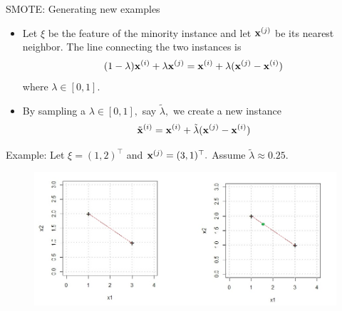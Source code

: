 \documentclass[11pt,compress,t,notes=noshow, xcolor=table]{beamer}
\begin{document}
\begin{frame}{SMOTE: Generating new examples}
    
    \begin{itemize}

        \item Let $\xi$ be the feature of the minority instance and let $\mathbf{x}^{(j)}$ be its nearest neighbor. The line connecting the two instances is
        $$		(1-\lambda) \mathbf{x}^{(i)} + \lambda\mathbf{x}^{(j)} = \mathbf{x}^{(i)} + \lambda(\mathbf{x}^{(j)} - \mathbf{x}^{(i)})	$$
        where $\lambda \in [0,1].$		
        
        \item By sampling a $\lambda \in [0,1],$ say $\tilde{\lambda},$ we create a new instance		
        $$   \tilde{\mathbf{x}}^{(i)} =  \mathbf{x}^{(i)} + \tilde{\lambda}(\mathbf{x}^{(j)} - \mathbf{x}^{(i)})	 $$

    \end{itemize}		
        
        Example: Let $\xi = (1,2)^\top$ and $\mathbf{x}^{(j)} = (3,1)^\top.$ Assume $\tilde{\lambda} \approx 0.25.$
    \begin{figure}
        \centering
        \includegraphics[width=0.8\linewidth]{figure_man/coordinate_system}
    \end{figure}

\end{frame}


\end{document}
